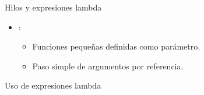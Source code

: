\begin{frame}[fragile]{Hilos y expresiones lambda}
\begin{itemize}
  \item {}:
    \begin{itemize}
       \item Funciones pequeñas definidas como parámetro.
       \item Paso simple de argumentos por referencia.
    \end{itemize}
\end{itemize}

\begin{block}{Uso de expresiones lambda}

\end{block}
\end{frame}

